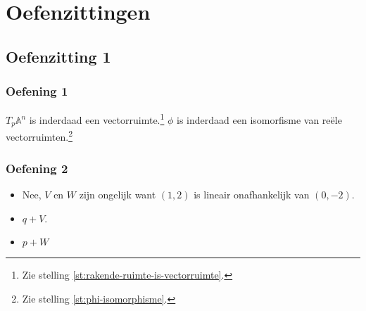 \documentclass[main.tex]{subfiles}
\begin{document}
\chapter{Oefenzittingen}
\label{cha:oefenzittingen}

\section{Oefenzitting 1}
\label{sec:oz1}

\subsection*{Oefening 1}
$T_{p}\mathbb{A}^{n}$ is inderdaad een vectorruimte.\footnote{Zie stelling \ref{st:rakende-ruimte-is-vectorruimte}.}
$\phi$ is inderdaad een isomorfisme van re\"ele vectorruimten.\footnote{Zie stelling \ref{st:phi-isomorphisme}.}

\subsection*{Oefening 2}

\begin{itemize}
\item Nee, $V$ en $W$ zijn ongelijk want $(1,2)$ is lineair onafhankelijk van $(0,-2)$.
\item $q + V$.
\item $p + W$
\end{itemize}
\end{document}
